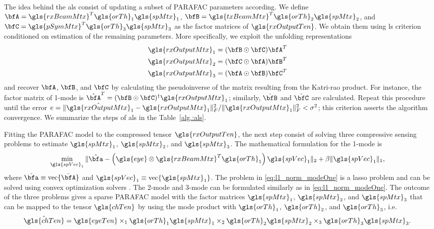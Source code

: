 \documentclass[conference]{IEEEtran}
\begin{document}
The idea behind the \gls{als} consist of updating a subset of \gls{PARAFAC} parameters
according. We define $\bfA =
\gls{rxBeamMtx}^T\gls{orTh}_1\gls{spMtx}_1$, $\bfB =
\gls{txBeamMtx}^T\gls{orTh}_2\gls{spMtx}_2$, and $\bfC =
\gls{pSymMtx}^T\gls{orTh}_3\gls{spMtx}_3$   as the factor matrices of
$\gls{rxOutputTen}$. We obtain them using \gls{ls} criterion conditioned on estimation of the remaining
parameters. More specifically, we exploit the unfolding representations
\begin{align}
 \gls{rxOutputMtx}_1 = (\bfB \odot \bfC)\bfA^T \\
 \gls{rxOutputMtx}_2 = (\bfC \odot \bfA)\bfB^T \\
 \gls{rxOutputMtx}_3 = (\bfA \odot \bfB)\bfC^T
\end{align}
and recover $\bfA$, $\bfB$, and $\bfC$ by calculating the pseudoinverse of the
matrix resulting from the Katri-rao product. For instance, the factor matrix of
1-mode is $\hat{\bfA}^T = (\bfB \odot \bfC)^{\dagger}\gls{rxOutputMtx}_1 $;
similarly, $\hat{\bfB}$ and $\hat{\bfC}$ are calculated. Repeat this procedure
until the error $e = \|\hat{\gls{rxOutputMtx}}_1 - \gls{rxOutputMtx}_1 \|^2_F/
\|\gls{rxOutputMtx}_1\|_F^2 < \sigma ^2$; this criterion asserts the algorithm convergence. We summarize the steps of \gls{als} in the Table~\ref{alg.:als}. 

Fitting the \gls{PARAFAC} model to the compressed tensor $\gls{rxOutputTen}$,
the next step consist of solving three compressive sensing problems to estimate
$\gls{spMtx}_1$, $\gls{spMtx}_2$, and $\gls{spMtx}_3$. The mathematical
formulation for the 1-mode is
\begin{equation}
  \label{eq:l1_norm_modeOne}
  \min_{\gls{spVec}_1} \|\hat{\bfa} - \left( \gls{eye} \otimes \gls{rxBeamMtx}^T\gls{orTh}_1\right) \gls{spVec}_1\|_2 + \beta \|\gls{spVec}_1\|_1, 
\end{equation}
where $\hat{\bfa} \equiv \textrm{vec}\{\hat{\bfA}\}$ and  $\gls{spVec}_1 \equiv
\textrm{vec}\{\gls{spMtx}_1\}$. The problem in \eqref{eq:l1_norm_modeOne} is a
\gls{lasso} problem and can be solved using convex optimization solvers
\cite{Boyd:2004}. The 2-mode and 3-mode can be formulated similarly as in
\eqref{eq:l1_norm_modeOne}. The outcome of the three problems gives a sparse \gls{PARAFAC} model with
the factor matrices $\gls{spMtx}_1$, $\gls{spMtx}_2$, and $\gls{spMtx}_3$ that
can be mapped to the tensor $\gls{chTen}$ by using the mode product with
$\gls{orTh}_1$,  $\gls{orTh}_2$, and $\gls{orTh}_3$, i.e.
\begin{equation}
  \label{eq:sparse_mapping}
 \hat{\gls{chTen}}  =   \gls{eyeTen} \times_1  \gls{orTh}_1\gls{spMtx}_1 \times_2  \gls{orTh}_2\gls{spMtx}_2 \times_3 \gls{orTh}_3\gls{spMtx}_3.
\end{equation}
\end{document}
